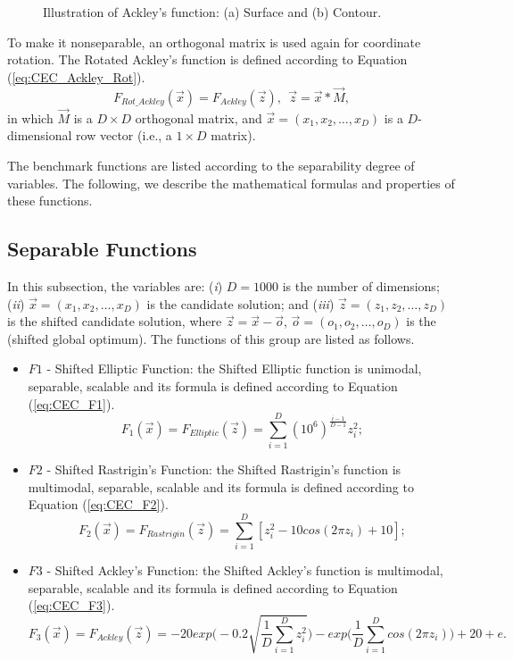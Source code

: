 \begin{itemize}
\begin{figure}[!h]
      \caption{Illustration of Ackley's function: (a) Surface and (b) Contour.}
      \label{fig:CEC_Ackley}
      \end{figure}
      To make it nonseparable, an orthogonal matrix is used again for coordinate rotation. The Rotated Ackley's function is defined according to Equation (\ref{eq:CEC_Ackley_Rot}).
      \begin{equation}\label{eq:CEC_Ackley_Rot}
      F_{Rot\_Ackley}(\vec{x}) = F_{Ackley}(\vec{z}), \ \ \vec{z} = \vec{x} \ast \vec{M},
      \end{equation}
      in which $\vec{M}$ is a $D \times D$ orthogonal matrix, and $\vec{x} = (x_1, x_2, \ldots, x_D)$ is a $D$-dimensional row vector (i.e., a $1 \times D$ matrix).
\end{itemize}

The benchmark functions are listed according to the separability degree of variables. The following, we describe the mathematical formulas and properties of these functions.

\subsection{Separable Functions}
In this subsection, the variables are: (\emph{i}) $D = 1000$ is the number of dimensions; (\emph{ii}) $\vec{x} = (x_1, x_2, \ldots, x_D)$ is the candidate solution; and (\emph{iii}) $\vec{z} = (z_1, z_2, \ldots, z_D)$ is the shifted candidate solution, where $\vec{z} = \vec{x} - \vec{o}$, $\vec{o} = (o_1, o_2, \ldots, o_D)$ is the (shifted global optimum). The functions of this group are listed as follows.
  \begin{itemize}
    \item $F1$ - Shifted Elliptic Function: the Shifted Elliptic function is unimodal, separable, scalable and its formula is defined according to Equation (\ref{eq:CEC_F1}).
        \begin{equation}\label{eq:CEC_F1}
            F_1(\vec{x}) = F_{Elliptic}(\vec{z}) = \sum_{i=1}^{D}(10^6)^{\frac{i-1}{D-1}}z_i^2;
        \end{equation}
    \item $F2$ - Shifted Rastrigin's Function: the Shifted Rastrigin's function is multimodal, separable, scalable and its formula is defined according to Equation (\ref{eq:CEC_F2}).
        \begin{equation}\label{eq:CEC_F2}
            F_2(\vec{x}) = F_{Rastrigin}(\vec{z}) = \sum_{i=1}^{D}[z_i^2 - 10cos(2 \pi z_i) + 10];
        \end{equation}    
    \item  $F3$ - Shifted Ackley's Function: the Shifted Ackley's function is multimodal, separable, scalable and its formula is defined according to Equation (\ref{eq:CEC_F3}).
        \begin{equation}\label{eq:CEC_F3}
            F_3(\vec{x}) = F_{Ackley}(\vec{z}) = -20exp\Biggl(-0.2 \sqrt{\frac{1}{D}\sum_{i=1}^{D}z_i^2}\Biggr) - exp\Biggl(\frac{1}{D}\sum_{i=1}^{D}cos(2 \pi z_i)\Biggr) + 20 + e.
        \end{equation}
  \end{itemize}
     
